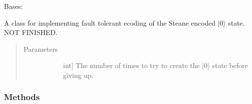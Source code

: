 \documentclass[letterpaper,10pt,english]{sphinxmanual}
\begin{document}
\begin{fulllineitems}
\begin{fulllineitems}
\begin{quote}
\begin{description}
\begin{description}
\end{description}

\end{description}\end{quote}

\end{fulllineitems}


\end{fulllineitems}


\begin{fulllineitems}
\label{\detokenize{Steane:Steane.SteaneFaultTolerantEncoder}}
\sphinxAtStartPar
Bases: {\hyperref[\detokenize{Base:BaseFaultTolerance.FaultTolerantEncoder}]{}}

\sphinxAtStartPar
A class for implementing fault tolerant ecoding of the Steane encoded \(|0\rangle\) state.
NOT FINISHED.
\begin{quote}\begin{description}
\item[{Parameters}] \leavevmode\begin{description}
\item[{}] \leavevmode{[}int{]}
\sphinxAtStartPar
The number of times to try to create the \(|0\rangle\) state before giving up.

\end{description}

\end{description}\end{quote}
\subsubsection*{Methods}


\begin{savenotes}\sphinxattablestart
\centering
\begin{tabulary}{\linewidth}[t]{|T|T|}
\hline


\end{tabulary}
\end{savenotes}
\end{fulllineitems}
\end{document}
